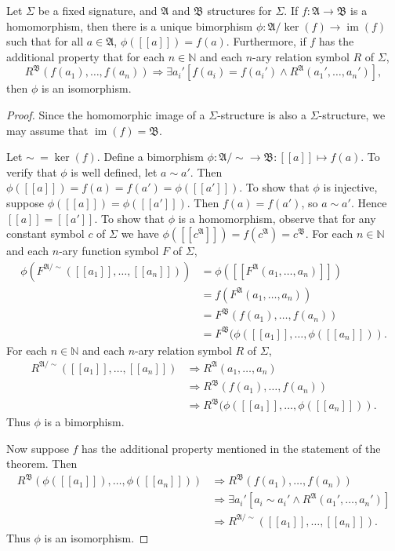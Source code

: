 \documentclass[12pt]{article}
\let	\Implies	=	\Rightarrow
\newcommand{\eqclass}[1]{[\![#1]\!]}
\newcommand{\qsim}{/\!\!\sim}
\DeclareMathOperator{\im}{im}
\newcommand{\A}{\mathfrak{A}}
\newcommand{\B}{\mathfrak{B}}
\newcommand{\NN}{\mathbb{N}}
\begin{document}
Let $\Sigma$ be a fixed signature, and $\A$ and $\B$ structures for $\Sigma$. If $f \colon \A \to \B$ is a homomorphism, then there is a unique bimorphism $\phi\colon\A/\!\ker(f) \to \im(f)$ such that for all \(a \in \A\), \(\phi(\eqclass{a}) = f(a)\). Furthermore, if $f$ has the additional property that for each \(n \in \NN\) and each $n$-ary relation symbol $R$  of $\Sigma$, 
\[
R^\B(f(a_1), \ldots, f(a_n)) \Implies \exists a_i'[ f(a_i) = f(a_i') \land R^\A(a_1', \ldots, a_n')],
\]
then $\phi$ is an isomorphism.

\begin{proof}
Since the homomorphic image of a $\Sigma$-structure is also a $\Sigma$-structure, we may assume that \(\im(f) = \B\).

Let \(\sim\ = \ker(f)\). Define a bimorphism $\phi \colon \A\qsim\to \B : \eqclass{a} \mapsto f(a)$. To verify that $\phi$ is well defined, let \(a \sim a'\). Then \(\phi(\eqclass{a}) = f(a) = f(a') = \phi(\eqclass{a'})\). To show that $\phi$ is injective, suppose \(\phi(\eqclass{a}) = \phi(\eqclass{a'})\). Then \(f(a) = f(a')\), so \(a \sim a'\). Hence \(\eqclass{a} = \eqclass{a'}\). To show that $\phi$ is a homomorphism, observe that for any constant symbol $c$ of $\Sigma$ we have \(\phi(\eqclass{c^\A}) = f(c^\A) = c^\B\). For each \(n \in \NN\) and each $n$-ary function symbol $F$ of $\Sigma$,
\begin{align*}
\phi(F^{\A/\!\sim}(\eqclass{a_1}, \ldots, \eqclass{a_n})) &= \phi(\eqclass{F^\A(a_1, \ldots, a_n)}) \\
&= f(F^\A(a_1, \ldots, a_n)) \\
&= F^\B(f(a_1), \ldots, f(a_n)) \\
&= F^\B(\phi(\eqclass{a_1}, \ldots, \phi(\eqclass{a_n})).
\end{align*}
For each \(n \in \NN\) and each $n$-ary relation symbol $R$ of $\Sigma$,
\begin{align*}
R^{\A/\!\sim}(\eqclass{a_1}, \ldots, \eqclass{a_n}) &\Implies R^\A(a_1, \ldots, a_n) \\
&\Implies R^\B(f(a_1), \ldots, f(a_n)) \\
&\Implies R^\B(\phi(\eqclass{a_1}, \ldots, \phi(\eqclass{a_n})).
\end{align*}
Thus $\phi$ is a bimorphism.

Now suppose $f$ has the additional property mentioned in the statement of the theorem. Then 
\begin{align*}
R^\B(\phi(\eqclass{a_1}), \ldots, \phi(\eqclass{a_n})) 
&\Implies R^\B(f(a_1), \ldots, f(a_n)) \\
&\Implies  \exists a_i'[ a_i \sim a_i' \land R^\A(a_1', \ldots, a_n')] \\
&\Implies R^{\A/\!\sim}(\eqclass{a_1}, \ldots, \eqclass{a_n}) .
\end{align*}
Thus $\phi$ is an isomorphism.
\end{proof}
\end{document}
